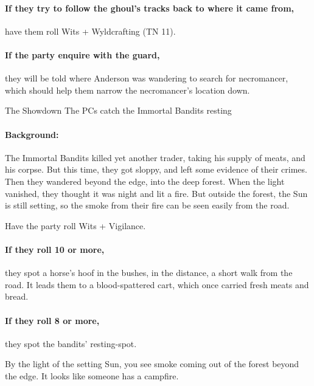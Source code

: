 \begin{multicols}{2}

\paragraph{If they try to follow the ghoul's tracks back to where it came from,}
have them roll Wits + Wyldcrafting (TN 11).

\paragraph{If the party enquire with the \gls{guard},}
they will be told where Anderson was wandering to search for \gls{necromancer}, which should help them narrow the necromancer's location down.

{The Showdown}%
{The PCs catch the Immortal Bandits resting}%

\paragraph{Background:}
The Immortal Bandits killed yet another trader, taking his supply of meats, and his corpse.
But this time, they got sloppy, and left some evidence of their crimes.
Then they wandered beyond the \gls{edge}, into the deep forest.
When the light vanished, they thought it was night and lit a fire.
But outside the forest, the Sun is still setting, so the smoke from their fire can be seen easily from the road.

Have the party roll Wits + Vigilance.

\paragraph{If they roll 10 or more,}
they spot a horse's hoof in the bushes, in the distance, a short walk from the road.
It leads them to a blood-spattered cart, which once carried fresh meats and bread.

\paragraph{If they roll 8 or more,}
they spot the bandits' resting-spot.

\begin{boxtext}
  By the light of the setting Sun, you see smoke coming out of the forest beyond the \gls{edge}.
  It looks like someone has a campfire.
\end{boxtext}


\end{multicols}
